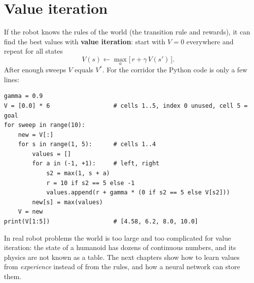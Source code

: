 \begin{center}
\label{fig:rl2_grid}
\end{center}

\section*{Value iteration}
If the robot knows the rules of the world (the transition rule and rewards), it can find the best values with \textbf{value iteration}: start with $V=0$ everywhere and repeat for all states
\[
V(s)\leftarrow\max_a\bigl[\,r+\gamma\,V(s')\,\bigr].
\]
After enough sweeps $V$ equals $V^*$. For the corridor the Python code is only a few lines:

\begin{verbatim}
gamma = 0.9
V = [0.0] * 6                  # cells 1..5, index 0 unused, cell 5 = goal
for sweep in range(10):
    new = V[:]
    for s in range(1, 5):      # cells 1..4
        values = []
        for a in (-1, +1):     # left, right
            s2 = max(1, s + a)
            r = 10 if s2 == 5 else -1
            values.append(r + gamma * (0 if s2 == 5 else V[s2]))
        new[s] = max(values)
    V = new
print(V[1:5])                  # [4.58, 6.2, 8.0, 10.0]
\end{verbatim}

\begin{aibox}
In real robot problems the world is too large and too complicated for value iteration: the state of a humanoid has dozens of continuous numbers, and its physics are not known as a table. The next chapters show how to learn values from \emph{experience} instead of from the rules, and how a neural network can store them.
\end{aibox}

